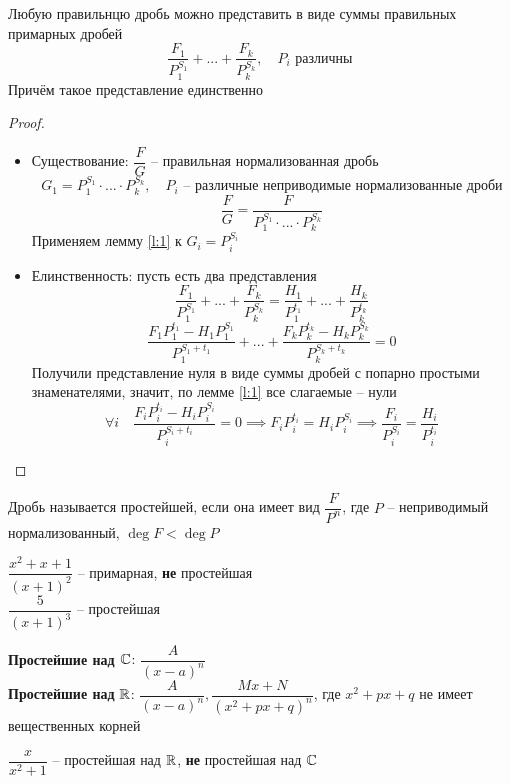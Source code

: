 \begin{lemma}
	Любую правильнцю дробь можно представить в виде суммы правильных примарных дробей
    $$ \frac{F_1}{P_1^{S_1}} + ... + \frac{F_k}{P_k^{S_k}}, \quad P_i \text{ различны} $$
    Причём такое представление единственно
\end{lemma}

\begin{proof}
	\hfill
    \begin{itemize}
        \item Существование: $\dfrac{F}G $ -- правильная нормализованная дробь
        $$ G_1 = P_1^{S_1} \cdot ... \cdot P_k^{S_k}, \quad P_i \text{ -- различные неприводимые нормализованные дроби} $$
        $$ \frac{F}G = \frac{F}{P_1^{S_1} \cdot ... \cdot P_k^{S_k}} $$
        Применяем лемму \ref{l:1} к $G_i = P_i^{S_i} $
        \item Елинственность: пусть есть два представления
        $$ \frac{F_1}{P_1^{S_1}} + ... + \frac{F_k}{P_k^{S_k}} = \frac{H_1}{P_1^{t_1}} + ... + \frac{H_k}{P_k^{t_k}} $$
        $$ \frac{F_1P_1^{t_1} - H_1P_1^{S_1}}{P_1^{S_1 + t_1}} + ... + \frac{F_kP_k^{t_k} - H_kP_k^{S_k}}{P_k^{S_k + t_k}} = 0 $$
        Получили представление нуля в виде суммы дробей с попарно простыми знаменателями, значит, по лемме \ref{l:1} все слагаемые -- нули
        $$ \forall i \quad \frac{F_iP_i^{t_i} - H_iP_i^{S_i}}{P_i^{S_i + t_i}} = 0 \implies F_iP_i^{t_i} = H_iP_i^{S_i} \implies \frac{F_i}{P_i^{S_i}} = \frac{H_i}{P_i^{t_i}} $$
    \end{itemize}
\end{proof}

\begin{definition}
    Дробь называется простейшей, если она имеет вид $\dfrac{F}{P^n}$, где $P$ -- неприводимый нормализованный, $\deg F < \deg P$
\end{definition}

\begin{eg}
    $ \dfrac{x^2 + x + 1}{(x + 1)^2}$ -- примарная, \textbf{не} простейшая \\
    $ \dfrac{5}{(x + 1)^3} $ -- простейшая
\end{eg}

\textbf{Простейшие над $\mathbb{C}$}: $\dfrac{A}{(x - a)^n} $ \\
\textbf{Простейшие над } $\mathbb{R}$: $\dfrac{A}{(x - a)^n}, \dfrac{Mx + N}{(x^2 + px + q)^n}$, где $x^2 + px + q$ не имеет вещественных корней

\begin{eg}
    $ \dfrac{x}{x^2 + 1}$ -- простейшая над $\mathbb{R}$, \textbf{не} простейшая над $\mathbb{C}$
\end{eg}

